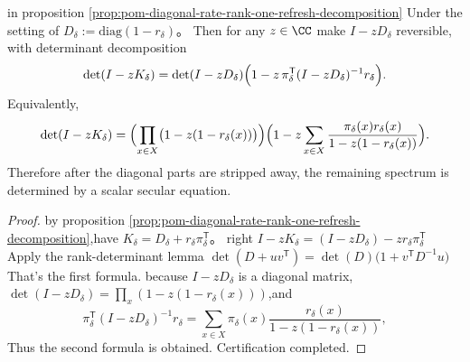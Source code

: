 \begin{theorem}\label{thm:pom-diagonal-rate-rank-one-refresh-determinant-collapse}
in proposition \ref{prop:pom-diagonal-rate-rank-one-refresh-decomposition} Under the setting of
\(
D_\delta:=\mathrm{diag}(1-r_\delta)
\)。
Then for any \(z\in\CC\) make \(I-zD_\delta\) reversible, with determinant decomposition
\[
\det(I-zK_\delta)=\det(I-zD_\delta)\Bigl(1-z\,\pi_\delta^{\mathsf T}(I-zD_\delta)^{-1}r_\delta\Bigr).
\]
Equivalently,
\[
\det(I-zK_\delta)
=\Bigl(\prod_{x\in X}\bigl(1-z(1-r_\delta(x))\bigr)\Bigr)
\Bigl(1-z\sum_{x\in X}\frac{\pi_\delta(x)r_\delta(x)}{1-z(1-r_\delta(x))}\Bigr).
\]
Therefore after the diagonal parts are stripped away, the remaining spectrum is determined by a scalar secular equation.
\end{theorem}
\begin{proof}
by proposition \ref{prop:pom-diagonal-rate-rank-one-refresh-decomposition},have \(K_\delta=D_\delta+r_\delta\pi_\delta^{\mathsf T}\)。
right
\(
I-zK_\delta=(I-zD_\delta)-z r_\delta\pi_\delta^{\mathsf T}
\)
Apply the rank-determinant lemma
\(
\det(D+uv^{\mathsf T})=\det(D)\bigl(1+v^{\mathsf T}D^{-1}u\bigr)
\)
That’s the first formula.
because \(I-zD_\delta\) is a diagonal matrix,\(\det(I-zD_\delta)=\prod_x(1-z(1-r_\delta(x)))\),and
\[
\pi_\delta^{\mathsf T}(I-zD_\delta)^{-1}r_\delta
=\sum_{x\in X}\pi_\delta(x)\frac{r_\delta(x)}{1-z(1-r_\delta(x))},
\]
Thus the second formula is obtained. Certification completed.
\end{proof}

